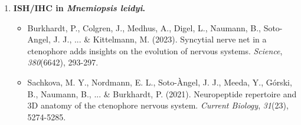 \documentclass[10pt]{report}
\begin{document}
\begin{enumerate}
	\item \textbf{ISH/IHC in \textit{Mnemiopsis leidyi}.}
		\begin{itemize}
			\item Burkhardt, P., Colgren, J., Medhus, A., Digel, L., Naumann, B., Soto-Angel, J. J., ... & Kittelmann, M. (2023). Syncytial nerve net in a ctenophore adds insights on the evolution of nervous systems. \textit{Science}, \textit{380}(6642), 293-297. 
			\item Sachkova, M. Y., Nordmann, E. L., Soto-Àngel, J. J., Meeda, Y., Górski, B., Naumann, B., ... & Burkhardt, P. (2021). Neuropeptide repertoire and 3D anatomy of the ctenophore nervous system. \textit{Current Biology}, \textit{31}(23), 5274-5285. 
		\end{itemize}
\end{enumerate}
\end{document}
